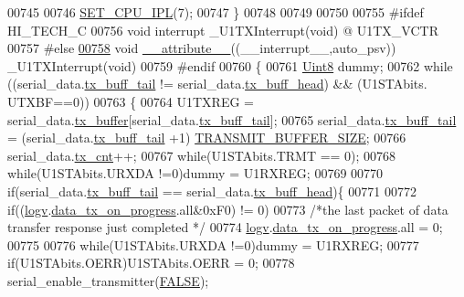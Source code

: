 \begin{DoxyCode}
{{{{{{00745 
00746     \hyperlink{a00015_a34d4c80d85281a545f3c7f1530803d65}{SET\_CPU\_IPL}(7);
00747 \}
00748 
00749 
00750 
00755 \textcolor{preprocessor}{#ifdef HI\_TECH\_C}
00756 \textcolor{keywordtype}{void} interrupt  \_U1TXInterrupt(\textcolor{keywordtype}{void}) @ U1TX\_VCTR
00757 \textcolor{preprocessor}{#else}
\hypertarget{a00030_source_l00758}{}\hyperlink{a00031_af419298e8d3acbb31667796fec870f76}{00758} \textcolor{keywordtype}{void} \hyperlink{a00030_a2068c3c2584547dbc1c8b9bca2d55b18}{\_\_attribute\_\_}((\_\_interrupt\_\_,auto\_psv)) \_U1TXInterrupt(\textcolor{keywordtype}{void})
00759 \textcolor{preprocessor}{#endif}
00760 \{
00761    \hyperlink{a00072_af84840501dec18061d18a68c162a8fa2}{Uint8} dummy;
00762     \textcolor{keywordflow}{while} ((serial\_data.\hyperlink{a00030_a6287e1447d7902b8bbc2f6359065dcbd}{tx\_buff\_tail} != serial\_data.\hyperlink{a00030_a3e2eda0a020422511de91b2bc7386083}{tx\_buff\_head}) && (U1STAbits.
      UTXBF==0))
00763     \{
00764         U1TXREG = serial\_data.\hyperlink{a00030_a327864d2719b5145f0eded883fe321c5}{tx\_buffer}[serial\_data.\hyperlink{a00030_a6287e1447d7902b8bbc2f6359065dcbd}{tx\_buff\_tail}];
00765         serial\_data.\hyperlink{a00030_a6287e1447d7902b8bbc2f6359065dcbd}{tx\_buff\_tail} = (serial\_data.\hyperlink{a00030_a6287e1447d7902b8bbc2f6359065dcbd}{tx\_buff\_tail} +1)%
      \hyperlink{a00031_aef714b16a48390956c10e8aa18d156b8}{TRANSMIT\_BUFFER\_SIZE};
00766         serial\_data.\hyperlink{a00030_ab6b71c720d341035fb26d723364eb879}{tx\_cnt}++;
00767         \textcolor{keywordflow}{while}(U1STAbits.TRMT == 0);
00768         \textcolor{keywordflow}{while}(U1STAbits.URXDA !=0)dummy = U1RXREG;
00769 
00770         \textcolor{keywordflow}{if}(serial\_data.\hyperlink{a00030_a6287e1447d7902b8bbc2f6359065dcbd}{tx\_buff\_tail} == serial\_data.\hyperlink{a00030_a3e2eda0a020422511de91b2bc7386083}{tx\_buff\_head})\{
00771 
00772           \textcolor{keywordflow}{if}((\hyperlink{a00021_a2e89c46668b39a17753c238950c9e1ec}{logv}.\hyperlink{a00021_a6cdefde69642ef511e3252c38be68516}{data\_tx\_on\_progress}.all&0xF0) != 0)
00773               \textcolor{comment}{/*the last packet of data transfer response just completed */}
00774               \hyperlink{a00021_a2e89c46668b39a17753c238950c9e1ec}{logv}.\hyperlink{a00021_a6cdefde69642ef511e3252c38be68516}{data\_tx\_on\_progress}.all = 0;
00775 
00776           \textcolor{keywordflow}{while}(U1STAbits.URXDA !=0)dummy = U1RXREG;
00777           \textcolor{keywordflow}{if}(U1STAbits.OERR)U1STAbits.OERR = 0;
00778           serial\_enable\_transmitter(\hyperlink{a00040_aa93f0eb578d23995850d61f7d61c55c1}{FALSE});
}}}}}}
\end{DoxyCode}

